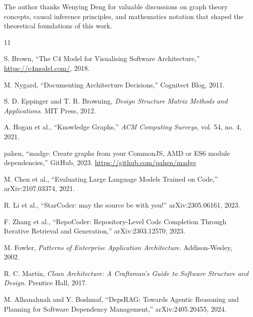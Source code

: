\documentclass[11pt,a4paper]{article}
\begin{document}
The author thanks Wenying Deng for valuable discussions on graph theory concepts, causal inference principles, and mathematics notation that shaped the theoretical foundations of this work.


\begin{thebibliography}{11}

S. Brown, ``The C4 Model for Visualising Software Architecture,'' \url{https://c4model.com/}, 2018.

M. Nygard, ``Documenting Architecture Decisions,'' Cognitect Blog, 2011.

S. D. Eppinger and T. R. Browning, \textit{Design Structure Matrix Methods and Applications}. MIT Press, 2012.

A. Hogan et al., ``Knowledge Graphs,'' \textit{ACM Computing Surveys}, vol. 54, no. 4, 2021.

pahen, ``madge: Create graphs from your CommonJS, AMD or ES6 module dependencies,'' GitHub, 2023. \url{https://github.com/pahen/madge}

M. Chen et al., ``Evaluating Large Language Models Trained on Code,'' arXiv:2107.03374, 2021.

R. Li et al., ``StarCoder: may the source be with you!'' arXiv:2305.06161, 2023.

F. Zhang et al., ``RepoCoder: Repository-Level Code Completion Through Iterative Retrieval and Generation,'' arXiv:2303.12570, 2023.

M. Fowler, \textit{Patterns of Enterprise Application Architecture}. Addison-Wesley, 2002.

R. C. Martin, \textit{Clean Architecture: A Craftsman's Guide to Software Structure and Design}. Prentice Hall, 2017.

M. Alhanahnah and Y. Boshmaf, ``DepsRAG: Towards Agentic Reasoning and Planning for Software Dependency Management,'' arXiv:2405.20455, 2024.

\end{thebibliography}
\end{document}
